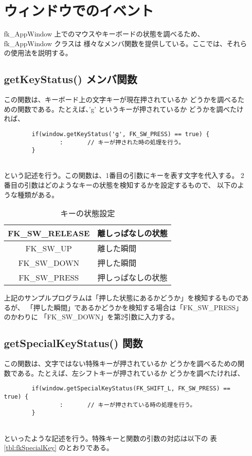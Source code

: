 \section{ウィンドウでのイベント}
fk\_AppWindow 上でのマウスやキーボードの状態を調べるため、fk\_AppWindow クラスは
様々なメンバ関数を提供している。ここでは、それらの使用法を説明する。
\subsection*{getKeyStatus() メンバ関数}
この関数は、キーボード上の文字キーが現在押されているか
どうかを調べるための関数である。たとえば、'g' というキーが押されているか
どうかを調べたければ、
\\
\begin{screen}
\begin{verbatim}
        if(window.getKeyStatus('g', FK_SW_PRESS) == true) {
                :       // キーが押された時の処理を行う。
        }
\end{verbatim}
\end{screen}
~ \\
という記述を行う。この関数は、1番目の引数にキーを表す文字を代入する。
2番目の引数はどのようなキーの状態を検知するかを設定するもので、
以下のような種類がある。

\begin{table}[H]
\caption{キーの状態設定}
\label{tbl:fkSwitchStatus}
\begin{center}
\begin{tabular}{|c|l|}
\hline
FK\_SW\_RELEASE & 離しっぱなしの状態 \\ \hline
FK\_SW\_UP & 離した瞬間 \\ \hline
FK\_SW\_DOWN & 押した瞬間 \\ \hline
FK\_SW\_PRESS & 押しっぱなしの状態 \\ \hline
\end{tabular}
\end{center}
\end{table}

上記のサンプルプログラムは「押した状態にあるかどうか」を検知するものであるが、
「押した瞬間」であるかどうかを検知する場合は「FK\_SW\_PRESS」のかわりに
「FK\_SW\_DOWN」を第2引数に入力する。

\subsection*{getSpecialKeyStatus() 関数}
この関数は、文字ではない特殊キーが押されているか
どうかを調べるための関数である。たとえば、左シフトキーが押されているか
どうかを調べたければ、
\\
\begin{screen}
\begin{verbatim}
        if(window.getSpecialKeyStatus(FK_SHIFT_L, FK_SW_PRESS) == true) {
                :       // キーが押されている時の処理を行う。
        }
\end{verbatim}
\end{screen}
~ \\
といったような記述を行う。特殊キーと関数の引数の対応は以下の
表 \ref{tbl:fkSpecialKey} のとおりである。

